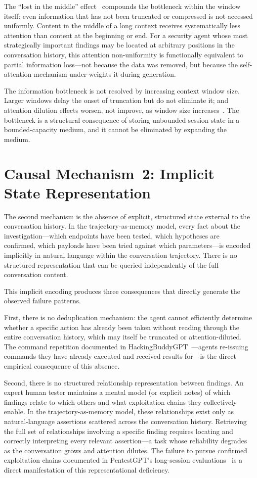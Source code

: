 \documentclass[12pt,a4paper,oneside,openany]{book}
\begin{document}
The ``lost in the middle'' effect~\citep{liu2023lost} compounds the bottleneck within the window itself: even information that has not been truncated or compressed is not accessed uniformly. Content in the middle of a long context receives systematically less attention than content at the beginning or end. For a security agent whose most strategically important findings may be located at arbitrary positions in the conversation history, this attention non-uniformity is functionally equivalent to partial information loss---not because the data was removed, but because the self-attention mechanism under-weights it during generation.

The information bottleneck is not resolved by increasing context window size. Larger windows delay the onset of truncation but do not eliminate it; and attention dilution effects worsen, not improve, as window size increases~\citep{liu2023lost}. The bottleneck is a structural consequence of storing unbounded session state in a bounded-capacity medium, and it cannot be eliminated by expanding the medium.

\section{Causal Mechanism~2: Implicit State Representation}

The second mechanism is the absence of explicit, structured state external to the conversation history. In the trajectory-as-memory model, every fact about the investigation---which endpoints have been tested, which hypotheses are confirmed, which payloads have been tried against which parameters---is encoded implicitly in natural language within the conversation trajectory. There is no structured representation that can be queried independently of the full conversation content.

This implicit encoding produces three consequences that directly generate the observed failure patterns.

First, there is no deduplication mechanism: the agent cannot efficiently determine whether a specific action has already been taken without reading through the entire conversation history, which may itself be truncated or attention-diluted. The command repetition documented in HackingBuddyGPT~\citep{happe2023hackerllm}---agents re-issuing commands they have already executed and received results for---is the direct empirical consequence of this absence.

Second, there is no structured relationship representation between findings. An expert human tester maintains a mental model (or explicit notes) of which findings relate to which others and what exploitation chains they collectively enable. In the trajectory-as-memory model, these relationships exist only as natural-language assertions scattered across the conversation history. Retrieving the full set of relationships involving a specific finding requires locating and correctly interpreting every relevant assertion---a task whose reliability degrades as the conversation grows and attention dilutes. The failure to pursue confirmed exploitation chains documented in PentestGPT's long-session evaluations~\citep{deng2024pentestgpt} is a direct manifestation of this representational deficiency.
\end{document}
